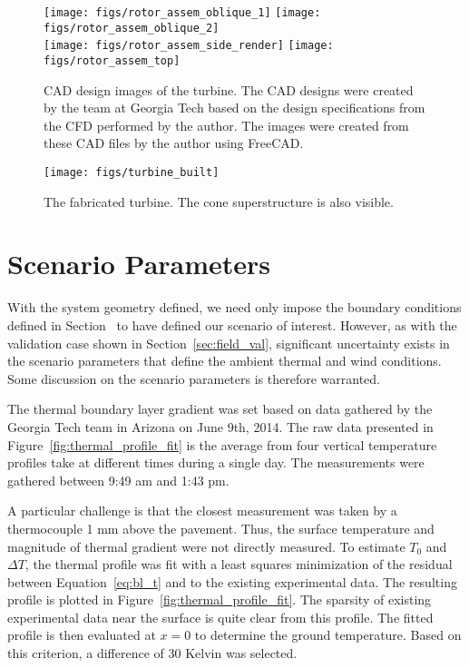   \begin{figure}
   \centering
   \texttt{[image: figs/rotor\_assem\_oblique\_1]}
   \hfill
   \texttt{[image: figs/rotor\_assem\_oblique\_2]}
   \\
   \vspace{1em}
   \texttt{[image: figs/rotor\_assem\_side\_render]}
   \hfill
   \texttt{[image: figs/rotor\_assem\_top]}
   \\   
   \caption{CAD design images of the turbine. The CAD designs were
   created by the team at Georgia Tech based on the design
   specifications from the CFD performed by the author. The images were
   created from these CAD files by the author using
   FreeCAD\cite{Falck}.}  
   \label{fig:cad_turbine}
  \end{figure}


  \begin{figure}
   \centering
   \texttt{[image: figs/turbine\_built]}
   \caption{The fabricated turbine. The cone superstructure is also
   visible.} 
   \label{fig:turbine_built}
  \end{figure}


\section{Scenario Parameters}
\label{subsec:scenario_param}

With the system geometry defined, we need only impose the boundary
conditions defined in Section~\label{sec:bc} to have defined our
scenario of interest. However, as with the validation case shown in
Section~\ref{sec:field_val}, significant uncertainty exists in the
scenario parameters that define the ambient thermal and wind
conditions. Some discussion on the scenario parameters is therefore
warranted. 

The thermal boundary layer gradient was set based on data gathered by 
the Georgia Tech team in Arizona on June 9th, 2014. The raw data
presented in Figure~\ref{fig:thermal_profile_fit} is the average from
four vertical temperature profiles take at different times during a
single day. The measurements were gathered between 9:49 am and 1:43
pm\cite{ann_comm}.  

A particular challenge is that the closest measurement was taken by a 
thermocouple 1 mm above the pavement. Thus, the surface temperature and
magnitude of thermal gradient were not directly measured. To estimate
$T_0$ and $\Delta T$, the thermal profile was fit with a least squares
minimization of the residual between Equation~\ref{eq:bl_t} and to the
existing experimental data. The resulting profile is plotted in
Figure~\ref{fig:thermal_profile_fit}. The sparsity of existing
experimental data near the surface is quite clear from this
profile. The fitted profile is then evaluated at $x=0$ to determine the
ground temperature. Based on this criterion, a difference of 30 Kelvin was
selected.   

